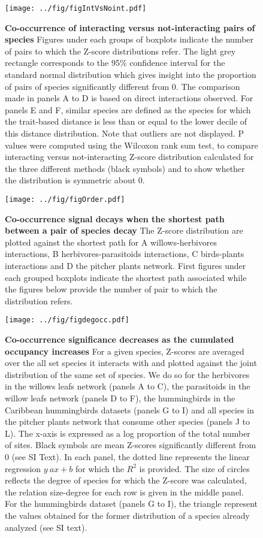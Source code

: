 \newpage

\begin{figure}[htbp]
\centering
\texttt{[image: ../fig/figIntVsNoint.pdf]}
\caption{\textbf{Co-occurrence of interacting versus not-interacting
pairs of species} Figures under each groups of boxplots indicate the
number of pairs to which the Z-score distributions refer. The light grey
rectangle corresponds to the 95\% confidence interval for the standard
normal distribution which gives insight into the proportion of pairs of
species significantly different from 0. The comparison made in panels A
to D is based on direct interactions observed. For panels E and F,
similar species are defined as the species for which the trait-based
distance is less than or equal to the lower decile of this distance
distribution. Note that outliers are not displayed. P values were
computed using the Wilcoxon rank sum test, to compare interacting versus
not-interacting Z-score distribution calculated for the three different
methods (black symbols) and to show whether the distribution is
symmetric about 0.\label{fig:synth}}
\end{figure}

\newpage

\begin{figure}[htbp]
\centering
\texttt{[image: ../fig/figOrder.pdf]}
\caption{\textbf{Co-occurrence signal decays when the shortest path
between a pair of species decay } The Z-score distribution are plotted
against the shortest path for A willows-herbivores interactions, B
herbivores-parasitoids interactions, C birds-plants interactions and D
the pitcher plants network. First figures under each grouped boxplots
indicate the shortest path associated while the figures below provide
the number of pair to which the distribution refers.\label{fig:shtpth}}
\end{figure}

\newpage

\begin{figure}[htbp]
\centering
\texttt{[image: ../fig/figdegocc.pdf]}
\caption{\textbf{Co-occurrence significance decreases as the cumulated
occupancy increases} For a given species, Z-scores are averaged over the
all set species it interacts with and plotted against the joint
distribution of the same set of species. We do so for the herbivores in
the willows leafs network (panels A to C), the parasitoids in the willow
leafs network (panels D to F), the hummingbirds in the Caribbean
hummingbirds datasets (panels G to I) and all species in the pitcher
plants network that consume other species (panels J to L). The x-axis is
expressed as a log proportion of the total number of sites. Black
symbols are mean Z-scores significantly different from 0 (see SI Text).
In each panel, the dotted line represents the linear regression
\(y~ax+b\) for which the \(R^2\) is provided. The size of circles
reflects the degree of species for which the Z-score was calculated, the
relation size-degree for each row is given in the middle panel. For the
hummingbirds dataset (panels G to I), the triangle represent the values
obtained for the former distribution of a species already analyzed (see
SI text).\label{fig:degocc}}
\end{figure}

\newpage
